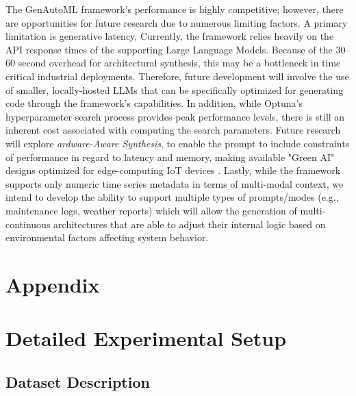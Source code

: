 \documentclass{article}
\begin{document}
The GenAutoML framework's performance is highly competitive; however, there are opportunities for future research due to numerous limiting factors. A primary limitation is generative latency, Currently, the framework relies heavily on the API response times of the supporting Large Language Models. Because of the 30--60 second overhead for architectural synthesis, this may be a bottleneck in time critical industrial deployments. Therefore, future development will involve the use of smaller, locally-hosted LLMs that can be specifically optimized for generating code through the framework's capabilities. In addition, while Optuna's hyperparameter search process provides peak performance levels, there is still an inherent cost associated with computing the search parameters. Future research will explore \textit{ardware-Aware Synthesis}, to enable the prompt to include constraints of performance in regard to latency and memory, making available "Green AI" designs optimized for edge-computing IoT devices \cite{cai2018proxylessnas}. Lastly, while the framework supports only numeric time series metadata in terms of multi-modal context, we intend to develop the ability to support multiple types of prompts/modes (e.g., maintenance logs, weather reports) which will allow the generation of multi-continuous architectures that are able to adjust their internal logic based on environmental factors affecting system behavior.

\newpage

 

\clearpage

\appendix
\section*{Appendix}

\section{Detailed Experimental Setup}
\label{app:detailed_setup}

\subsection{Dataset Description}
\end{document}

